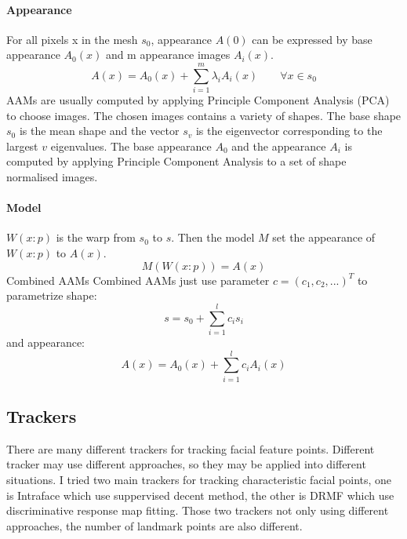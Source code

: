 \paragraph{Appearance}
For all pixels x in the mesh $s_{0}$, appearance $A(0)$ can be expressed by base appearance $A_{0}(x)$ and m appearance images $A_{i}(x)$.
\begin{equation}
A(x) = A_{0}(x) + \sum_{i=1}^{m}\lambda_{i}A_{i}(x) \qquad \forall x \in s_{0}
\end{equation}
\newline
AAMs are usually computed by applying Principle Component Analysis (PCA) to choose images. The chosen images contains a variety of shapes. The base shape $s_{0}$ is the mean shape and the vector $s_{v}$ is the eigenvector corresponding to the largest $v$ eigenvalues. The base appearance $A_{0}$ and the appearance $A_{i}$ is computed by applying Principle Component Analysis to a set of shape normalised images.
\paragraph{Model} 
$W(x:p)$ is the warp from $s_{0}$ to $s$. Then the model $M$ set the appearance of $W(x:p)$ to $A(x)$.
\begin{equation}
M(W(x:p)) = A(x)
\end{equation}
\newline
Combined AAMs
\newline
Combined AAMs just use parameter $c = (c_{1},c_{2},...)^{T}$ to parametrize shape:
\begin{equation}
s = s_{0} + \sum_{i=1}^{l}c_{i}s_{i}
\end{equation}
and appearance:
\begin{equation}
A(x) = A_{0}(x) + \sum_{i=1}^{l}c_{i}A_{i}(x)
\end{equation}

\subsection{Trackers}
There are many different trackers for tracking facial feature points. Different tracker may use different approaches, so they may be applied into different situations. I tried two main trackers for tracking characteristic facial points, one is Intraface \cite{xiong2013supervised} which use suppervised decent method, the other is DRMF \cite{asthana2013robust} which use discriminative response map fitting. Those two trackers not only using different approaches, the number of landmark points are also different.
